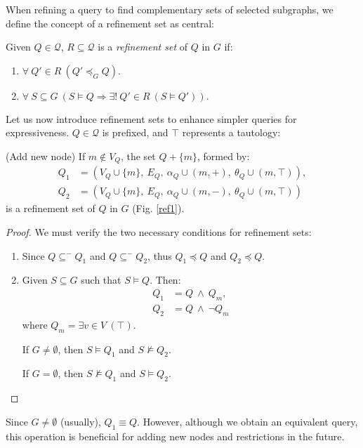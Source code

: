 \documentclass{article}%
\begin{document}
When refining a query to find complementary sets of selected subgraphs, we define the concept of a refinement set as central:

\begin{definition}{}
    Given $Q\in \mathcal{Q}$, $R\subseteq \mathcal{Q}$ is a \emph{refinement set} of $Q$ in $G$ if:
    \begin{enumerate}
        \item $\forall\ Q'\in R\ (Q'\preceq_G Q).$
        \item $\forall\ S\subseteq G\ (S\vDash Q\Rightarrow \exists !\ Q'\in R\ (S\vDash Q')).$
    \end{enumerate}
\end{definition}\medskip

Let us now introduce refinement sets to enhance simpler queries for expressiveness. $Q\in\mathcal{Q}$ is prefixed, and $\top$ represents a tautology:

\begin{theorem}{(Add new node)}
    If $m\notin V_Q$, the set $Q+\{m\}$, formed by:
        \begin{align*}
        Q_1 &= (V_Q\cup\{m\},\ E_Q,\ \alpha_Q\cup(m,+),\ \theta_Q\cup(m,\top)) , \\ 
         Q_2 &= (V_Q\cup\{m\},\ E_Q,\ \alpha_Q\cup(m,-),\ \theta_Q\cup(m,\top))
        \end{align*}
    is a refinement set of $Q$ in $G$ (Fig. \ref{ref1}).
\end{theorem}
\begin{proof}{}
	We must verify the two necessary conditions for refinement sets:
	\begin{enumerate}
		\item Since $Q\subseteq^- Q_1$ and $Q\subseteq^- Q_2$, thus $Q_1\preceq Q$ and $Q_2\preceq Q$.
		\item Given $S\subseteq G$ such that $S\vDash Q$. Then:
		\begin{align*}
		Q_1&= Q\ \wedge\ Q_m ,\\
		Q_2&= Q\ \wedge\ \neg Q_m 
		\end{align*}
		where $Q_m=\exists v\in V\ (\top)$.
		
		If $G\neq \emptyset$, then $S\vDash Q_1$ and $S\nvDash Q_2$.
		
		If $G= \emptyset$, then $S\nvDash Q_1$ and $S\vDash Q_2$.
	\end{enumerate}
\end{proof}

Since $ G \neq \emptyset $ (usually), $ Q_1 \equiv Q $. However, although we obtain an equivalent query, this operation is beneficial for adding new nodes and restrictions in the future.
\end{document}

